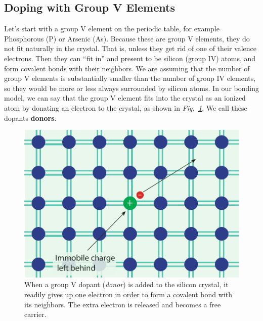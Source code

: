\subsection{Doping with Group V Elements}
Let’s start with a group V element on the periodic table, for example Phosphorous (P) or Arsenic (As).  Because these are group V elements, they do not fit naturally in the crystal.  That is, unless they get rid of one of their valence electrons.  Then they can “fit in” and present to be silicon (group IV) atoms, and form covalent bonds with their neighbors.  We are assuming that the number of group V elements is substantially smaller than the number of group IV elements, so they would be more or less always surrounded by silicon atoms.  In our bonding model, we can say that the group V element fits into the crystal as an ionized atom by donating an electron to the crystal, as shown in \emph{Fig.~\ref{fig:silicon_dopant_V}}.   We call these dopants \textbf{donors}.
\begin{figure}[tb]
\centering
\includegraphics[width=.5\columnwidth]{silicon_dopant_V}
\caption{When a group V dopant (\emph{donor}) is added to the silicon crystal, it readily gives up one electron in order to form a covalent bond with its neighbors.  The extra electron is released and becomes a free carrier.}
\label{fig:silicon_dopant_V}
\end{figure}
